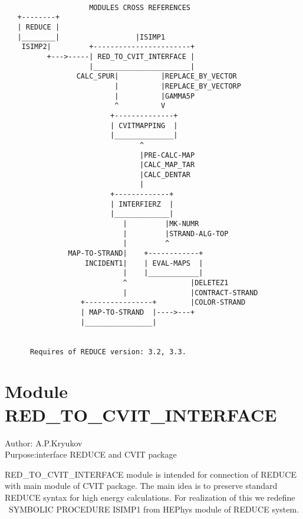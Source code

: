 \newpage
\begin{verbatim}

                    MODULES CROSS REFERENCES
   +--------+
   | REDUCE |
   |________|                  |ISIMP1
    ISIMP2|         +-----------------------+
          +--->-----| RED_TO_CVIT_INTERFACE |
                    |_______________________|
                 CALC_SPUR|          |REPLACE_BY_VECTOR
                          |          |REPLACE_BY_VECTORP
                          |          |GAMMA5P
                          ^          V
                         +--------------+
                         | CVITMAPPING  |
                         |______________|
                                ^
                                |PRE-CALC-MAP
                                |CALC_MAP_TAR
                                |CALC_DENTAR
                                |
                         +-------------+
                         | INTERFIERZ  |
                         |_____________|
                            |         |MK-NUMR
                            |         |STRAND-ALG-TOP
                            |         ^
               MAP-TO-STRAND|    +------------+
                   INCIDENT1|    | EVAL-MAPS  |
                            |    |____________|
                            ^               |DELETEZ1
                            |               |CONTRACT-STRAND
                  +----------------+        |COLOR-STRAND
                  | MAP-TO-STRAND  |---->---+
                  |________________|


      Requires of REDUCE version: 3.2, 3.3.

\end{verbatim}


\section*{Module RED\_TO\_CVIT\_INTERFACE}

\begin{center}
Author: A.P.Kryukov \\
Purpose:interface REDUCE and CVIT package
\end{center}

RED\_TO\_CVIT\_INTERFACE module is intended for connection of REDUCE
with main module of CVIT package. The main idea is to preserve
standard REDUCE syntax for high energy calculations.  For realization
of this we redefine {\ SYMBOLIC PROCEDURE ISIMP1} from HEPhys module of
REDUCE system.

